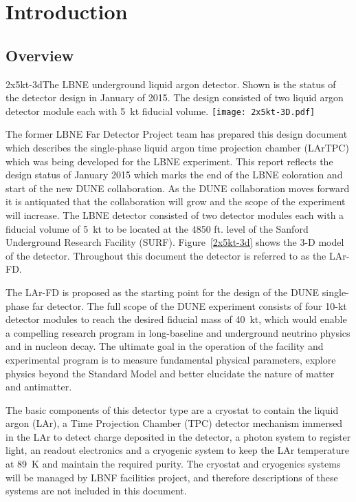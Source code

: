 \chapter{Introduction}

\section{Overview}
\begin{cdrfigure}{2x5kt-3d}{The LBNE underground liquid argon detector. Shown is the status of the detector design in January of 2015. The design consisted of two liquid argon detector module each with 5~kt fiducial volume.}
 \texttt{[image: 2x5kt-3D.pdf]}
 \end{cdrfigure}

The former LBNE Far Detector Project team has prepared this design document which describes the single-phase liquid argon time projection chamber (LArTPC) which was being developed for the LBNE experiment. This report reflects the design status of January 2015 which marks the end of the LBNE coloration and start of the new DUNE collaboration. As the DUNE collaboration moves forward it is antiquated that the collaboration will grow and the scope of the experiment will increase. The LBNE detector consisted of two detector modules each with a fiducial volume of 5~kt to be located at the 4850 ft. level of the Sanford Underground Research Facility (SURF). Figure~\ref{2x5kt-3d} shows the 3-D model of the detector. Throughout this document the detector is referred to as the LAr-FD. 

The LAr-FD is proposed as the starting point for the design of the DUNE single-phase far detector. The full scope of the DUNE experiment consists of four 10-kt detector modules to reach the desired fiducial mass of 40~kt, which would enable a compelling research program in long-baseline and underground neutrino physics and in nucleon decay. The ultimate goal in the operation of the facility and experimental program is to measure fundamental physical parameters, explore physics beyond the Standard Model and better elucidate the nature of matter and antimatter. 

The basic components of this detector type are a cryostat to contain the liquid argon (LAr),  a  Time Projection Chamber (TPC) detector mechanism immersed in the LAr to detect charge deposited in the detector, a photon system to register light,  an readout electronics and a cryogenic system to keep the LAr temperature at 89~K and maintain the required purity.  The cryostat and cryogenics systems will be managed by LBNF facilities project, and therefore descriptions of these systems are not included in this document. 

